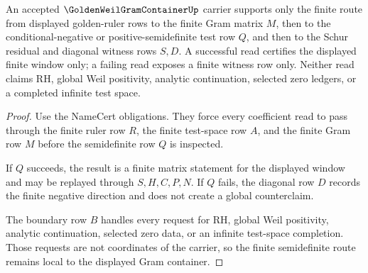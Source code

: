 \begin{theorem}
\label{thm:golden-weil-gram-container-cnd-route}
An accepted $\GoldenWeilGramContainerUp$ carrier supports only the finite route from displayed golden-ruler rows to the finite Gram matrix $M$, then to the conditional-negative or positive-semidefinite test row $Q$, and then to the Schur residual and diagonal witness rows $S,D$. A successful read certifies the displayed finite window only; a failing read exposes a finite witness row only. Neither read claims RH, global Weil positivity, analytic continuation, selected zero ledgers, or a completed infinite test space.
\end{theorem}
\begin{proof}
Use the NameCert obligations. They force every coefficient read to pass through the finite ruler row $R$, the finite test-space row $A$, and the finite Gram row $M$ before the semidefinite row $Q$ is inspected.

If $Q$ succeeds, the result is a finite matrix statement for the displayed window and may be replayed through $S,H,C,P,N$. If $Q$ fails, the diagonal row $D$ records the finite negative direction and does not create a global counterclaim.

The boundary row $B$ handles every request for RH, global Weil positivity, analytic continuation, selected zero data, or an infinite test-space completion. Those requests are not coordinates of the carrier, so the finite semidefinite route remains local to the displayed Gram container.
\end{proof}




